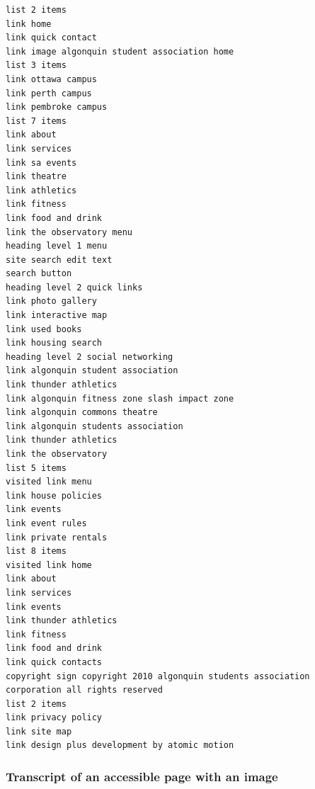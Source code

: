 \documentclass[]{article}
\begin{document}
\begin{verbatim}
list 2 items
link home
link quick contact
link image algonquin student association home
list 3 items
link ottawa campus
link perth campus
link pembroke campus
list 7 items
link about
link services
link sa events
link theatre
link athletics
link fitness
link food and drink
link the observatory menu
heading level 1 menu
site search edit text
search button
heading level 2 quick links
link photo gallery
link interactive map
link used books
link housing search
heading level 2 social networking
link algonquin student association
link thunder athletics
link algonquin fitness zone slash impact zone
link algonquin commons theatre
link algonquin students association
link thunder athletics
link the observatory
list 5 items
visited link menu
link house policies
link events
link event rules
link private rentals
list 8 items
visited link home
link about
link services
link events
link thunder athletics
link fitness
link food and drink
link quick contacts
copyright sign copyright 2010 algonquin students association corporation all rights reserved
list 2 items
link privacy policy
link site map
link design plus development by atomic motion
\end{verbatim}

\subsubsection{Transcript of an accessible page with an
image}\label{transcript-of-an-accessible-page-with-an-image}
\end{document}
